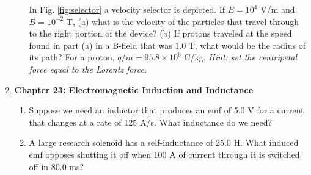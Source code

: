 \documentclass[10pt]{article}
\begin{document}
\begin{enumerate}
\begin{enumerate}
\begin{figure}
\end{figure}
In Fig. \ref{fig:selector} a velocity selector is depicted.  If $E = 10^4$ V/m and $B = 10^{-2}$ T, (a) what is the velocity of the particles that travel through to the right portion of the device? (b) If protons traveled at the speed found in part (a) in a B-field that was 1.0 T, what would be the radius of its path? For a proton, $q/m = 95.8 \times 10^{6}$ C/kg. \textit{Hint: set the centripetal force equal to the Lorentz force.} \\ \vspace{4cm}
\end{enumerate}
\item \textbf{Chapter 23: Electromagnetic Induction and Inductance}
\begin{enumerate}
\item Suppose we need an inductor that produces an emf of 5.0 V for a current that changes at a rate of 125 A/s.  What inductance do we need? \\ \vspace{1cm}
\item A large research solenoid has a self-inductance of 25.0 H. What induced emf opposes shutting it off when 100 A of current through it is switched off in 80.0 ms?
\end{enumerate}
\end{enumerate}
\end{document}
